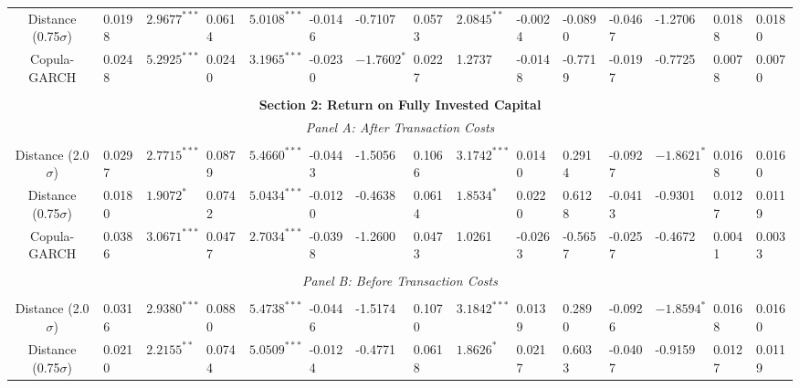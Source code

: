 \documentclass[a4paper]{article}
\begin{document}
\begin{sidewaystable}
\begin{threeparttable}[H]
\begin{tabularx}{\textwidth}{@{\extracolsep{\fill}}lllllllllllllll@{}}
				\multicolumn{1}{c}{Distance (0.75$\sigma$)} & 0.0198 & $2.9677^{***}$ & 0.0614 & $5.0108^{***}$ & -0.0146 & -0.7107 & 0.0573 & $2.0845^{**}$ & -0.0024 & -0.0890 & -0.0467 & -1.2706 & 0.0188 & 0.0180 \\
				\multicolumn{1}{c}{Copula-GARCH} & 0.0248 & $5.2925^{***}$ & 0.0240 & $3.1965^{***}$ & -0.0230 & $-1.7602^{*}$ & 0.0227 & 1.2737 & -0.0148 & -0.7719 & -0.0197 & -0.7725 & 0.0078 & 0.0070 \\
				&       &       &       &       &       &       &       &       &       &       &       &       &       &  \\
				\midrule
				\multicolumn{15}{c}{\textbf{Section 2: Return on Fully Invested Capital}} \\
				\multicolumn{15}{c}{\textit{Panel A: After Transaction Costs}} \\
				&       &       &       &       &       &       &       &       &       &       &       &       &       &  \\
				\multicolumn{1}{c}{Distance (2.0$\sigma$)} & 0.0297 & $2.7715^{***}$ & 0.0879 & $5.4660^{***}$ & -0.0443 & -1.5056 & 0.1066 & $3.1742^{***}$ & 0.0140 & 0.2914 & -0.0927 & $-1.8621^{*}$ & 0.0168 & 0.0160 \\
				\multicolumn{1}{c}{Distance (0.75$\sigma$)} & 0.0180 & $1.9072^{*}$ & 0.0742 & $5.0434^{***}$ & -0.0120 & -0.4638 & 0.0614 & $1.8534^{*}$ & 0.0220 & 0.6128 & -0.0413 & -0.9301 & 0.0127 & 0.0119 \\
				\multicolumn{1}{c}{Copula-GARCH} & 0.0386 & $3.0671^{***}$ & 0.0477 & $2.7034^{***}$ & -0.0398 & -1.2600 & 0.0473 & 1.0261 & -0.0263 & -0.5657 & -0.0257 & -0.4672 & 0.0041 & 0.0033 \\
				&       &       &       &       &       &       &       &       &       &       &       &       &       &  \\
				\multicolumn{15}{c}{\textit{Panel B: Before Transaction Costs}} \\
				&       &       &       &       &       &       &       &       &       &       &       &       &       &  \\
				\multicolumn{1}{c}{Distance (2.0$\sigma$)} & 0.0316 & $2.9380^{***}$ & 0.0880 & $5.4738^{***}$ & -0.0446 & -1.5174 & 0.1070 & $3.1842^{***}$ & 0.0139 & 0.2890 & -0.0926 & $-1.8594^{*}$ & 0.0168 & 0.0160 \\
				\multicolumn{1}{c}{Distance (0.75$\sigma$)} & 0.0210 & $2.2155^{**}$ & 0.0744 & $5.0509^{***}$ & -0.0124 & -0.4771 & 0.0618 & $1.8626^{*}$ & 0.0217 & 0.6033 & -0.0407 & -0.9159 & 0.0127 & 0.0119 \\

\end{tabularx}
\end{threeparttable}
\end{sidewaystable}
\end{document}
